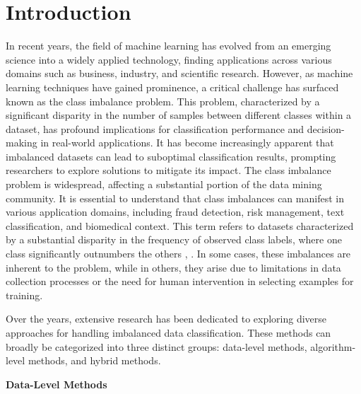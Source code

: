 \section{Introduction}

In recent years, the field of machine learning has evolved from an emerging science into a widely applied technology, finding applications across various domains such as business, industry, and scientific research. However, as machine learning techniques have gained prominence, a critical challenge has surfaced known as the class imbalance problem. This problem, characterized by a significant disparity in the number of samples between different classes within a dataset, has profound implications for classification performance and decision-making in real-world applications.
It has become increasingly apparent that imbalanced datasets can lead to suboptimal classification results, prompting researchers to explore solutions to mitigate its impact. The class imbalance
problem is widespread, affecting a substantial portion of the data mining community. It is essential
to understand that class imbalances can manifest in various application domains, including fraud detection, risk management, text classification, and biomedical context. This term refers to datasets characterized by a substantial disparity in the frequency of observed class labels, where one class significantly outnumbers the others \cite{OBrien2019}, \cite{Tarawneh2020} ⁠. In some cases, these imbalances are inherent to the problem, while in others, they arise due to limitations in data collection processes or the need for human intervention in selecting examples for training.

Over the years, extensive research has been dedicated to exploring diverse approaches for handling imbalanced data classification. These methods can broadly be categorized into three distinct groups: data-level methods, algorithm-level methods, and hybrid methods. 

\textbf{Data-Level Methods} 

